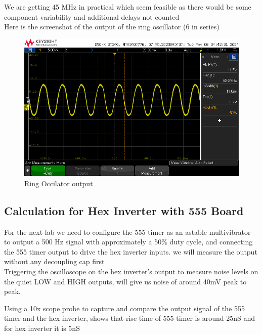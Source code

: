 \documentclass[a4paper,11pt]{article}%
\begin{document}
We are getting 45 MHz in practical which seem feasible as there would be some component variability and additional delays not counted\\

Here is the screenshot of the output of the ring oscillator (6 in series) 

\begin{figure}[H]
	\centering
	\includegraphics[scale=0.6]{figures/ring_oscillator.png}
	\caption{Ring Occilator output}
	\label{ring}
\end{figure}	

\subsection{Calculation for Hex Inverter with 555 Board}

For the next lab we need to configure the 555 timer as an astable multivibrator to output a 500 Hz signal with approximately a 50\% duty cycle, and connecting the 555 timer output to drive the hex inverter inputs. we will measure the output without any decoupling cap first\\

Triggering the oscilloscope on the hex inverter's output to measure noise levels on the quiet LOW and HIGH outputs, will give us noise of around 40mV peak to peak.

Using a 10x scope probe to capture and compare the output signal of the 555 timer and the hex inverter, shows that rise time of 555 timer is around 25nS and for hex inverter it is 5nS
\end{document}

